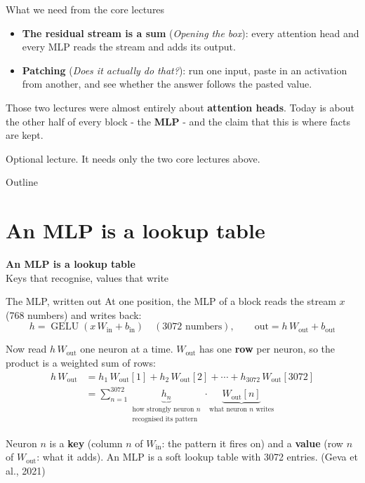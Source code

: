 \documentclass[aspectratio=169]{beamer}
\newcommand{\keybox}[1]{%
  \begin{tcolorbox}[colback=armblue!8, colframe=armblue, boxrule=0.6pt, arc=2pt]
  #1
  \end{tcolorbox}}
\newcommand{\sectiontransition}[2]{%
  \begin{frame}[plain]
    \vfill
    \begin{center}
      {\Huge\bfseries\color{popblue} #1}\\[1.1em]
      {\large #2}
    \end{center}
    \vfill
  \end{frame}}
\begin{document}
\begin{frame}{What we need from the core lectures}
  \vspace{0.5em}
  \begin{itemize}
    \item \textbf{The residual stream is a sum} (\emph{Opening the box}): every attention head and
      every MLP reads the stream and adds its output.
    \item \textbf{Patching} (\emph{Does it actually do that?}): run one input, paste in an
      activation from another, and see whether the answer follows the pasted value.
  \end{itemize}

  \vspace{0.8em}
  \keybox{\small Those two lectures were almost entirely about \textbf{attention heads}. Today is
  about the other half of every block - the \textbf{MLP} - and the claim that this is where facts
  are kept.}

  \vspace{0.4em}
  {\footnotesize Optional lecture. It needs only the two core lectures above.}
\end{frame}

\begin{frame}{Outline}
  \tableofcontents
\end{frame}

\section{An MLP is a lookup table}
\sectiontransition{An MLP is a lookup table}{Keys that recognise, values that write}

\begin{frame}{The MLP, written out}
  At one position, the MLP of a block reads the stream $x$ (768 numbers) and writes back:
  \[
    h = \operatorname{GELU}(x\, W_{\text{in}} + b_{\text{in}}) \quad (3072 \text{ numbers}),
    \qquad \text{out} = h\, W_{\text{out}} + b_{\text{out}}
  \]

  Now read $h\, W_{\text{out}}$ one neuron at a time. $W_{\text{out}}$ has one \textbf{row} per
  neuron, so the product is a weighted sum of rows:
  \begin{align*}
    h\, W_{\text{out}}
      &= h_1\, W_{\text{out}}[1] + h_2\, W_{\text{out}}[2] + \cdots + h_{3072}\, W_{\text{out}}[3072]\\
      &= \sum_{n=1}^{3072} \underbrace{h_n}_{\substack{\text{how strongly neuron } n\\ \text{recognised its pattern}}}
         \cdot \underbrace{W_{\text{out}}[n]}_{\text{what neuron } n \text{ writes}}
  \end{align*}

  \vspace{-0.4em}
  \keybox{\small Neuron $n$ is a \textbf{key} (column $n$ of $W_{\text{in}}$: the pattern it fires
  on) and a \textbf{value} (row $n$ of $W_{\text{out}}$: what it adds). An MLP is a soft lookup
  table with 3072 entries. {\footnotesize (Geva et al., 2021)}}
\end{frame}
\end{document}
